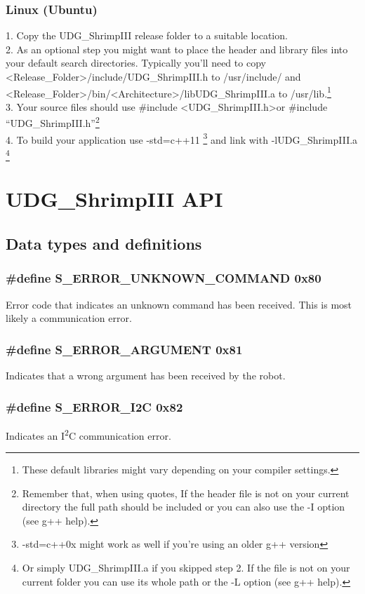 \documentclass{book}
\begin{document}
\subsection{Linux (Ubuntu)}
1. Copy the UDG\_ShrimpIII release folder to a suitable location.\\
2. As an optional step you might want to place the header and library files into your default search directories. Typically you'll need to copy \textless{}Release\_Folder\textgreater{}/include/UDG\_ShrimpIII.h to /usr/include/ and \textless{}Release\_Folder\textgreater{}/bin/\textless{}Architecture\textgreater{}/libUDG\_ShrimpIII.a to /usr/lib.\footnote{These default libraries might vary depending on your compiler settings.}\\
3. Your source files should use \#include \textless UDG\_ShrimpIII.h\textgreater or \#include ``UDG\_ShrimpIII.h''\footnote{Remember that, when using quotes, If the header file is not on your current directory the full path should be included or you can also use the -I option (see g++ help).}\\
4. To build your application use -std=c++11 \footnote{ -std=c++0x might work as well if you're using an older g++ version} and link with -lUDG\_ShrimpIII.a \footnote{Or simply UDG\_ShrimpIII.a if you skipped step 2. If the file is not on your current folder you can use its whole path or the -L option (see g++ help).}


\chapter{UDG\_ShrimpIII API}
\section{Data types and definitions}

\subsection{\#define S\_ERROR\_UNKNOWN\_COMMAND 0x80 }
Error code that indicates an unknown command has been received. This is most likely a communication error.
\subsection{\#define S\_ERROR\_ARGUMENT 0x81}
Indicates that a wrong argument has been received by the robot.
\subsection{\#define S\_ERROR\_I2C 0x82}
Indicates an I\textsuperscript{2}C communication error.
\end{document}
